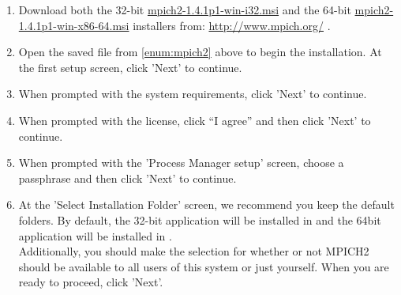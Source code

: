 \begin{enumerate}
  \item Download both the 32-bit
  \href{http://www.mpich.org/static/tarballs/1.4.1p1/mpich2-1.4.1p1-win-ia32.msi}{mpich2-1.4.1p1-win-i32.msi} 
  and the 64-bit
  \href{http://www.mpich.org/static/tarballs/1.4.1p1/mpich2-1.4.1p1-win-x86-64.msi}{mpich2-1.4.1p1-win-x86-64.msi}
  installers from: \url{http://www.mpich.org/} .\label{enum:mpich2}
  \item Open the saved file from \ref{enum:mpich2} above to begin the installation.  At the first setup screen, click 'Next' to continue.
  \item When prompted with the system requirements, click 'Next' to continue.
  \item When prompted with the license, click ``I agree'' and then click 'Next' to continue.
  \item When prompted with the 'Process Manager setup' screen, choose a passphrase and then click 'Next' to continue.
  \item At the 'Select Installation Folder' screen, we recommend you keep the default folders.  By default, the 32-bit application will be installed in  and the 64bit application will be installed in .\\[.2cm] Additionally, you should make the selection for whether or not MPICH2 should be available to all users of this system or just yourself.  When you are ready to proceed, click 'Next'.

\end{enumerate}

